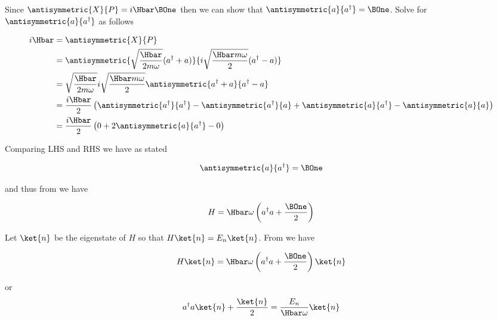 Since \(\antisymmetric{X}{P} = i \Hbar \BOne\) then we can show that \(\antisymmetric{a}{a^\dagger} = \BOne\).  Solve for \(\antisymmetric{a}{a^\dagger}\) as follows

\begin{equation}\label{eqn:lecture11harmonicOscillator:660}
\begin{aligned}
i \Hbar
&=
\antisymmetric{X}{P} \\
&=
\antisymmetric{\sqrt{\frac{\Hbar}{2 m \omega}} (a^\dagger + a) }{i \sqrt{\frac{\Hbar m \omega}{2}} (a^\dagger -a)} \\
&=
\sqrt{\frac{\Hbar}{2 m \omega}} i \sqrt{\frac{\Hbar m \omega}{2}}
\antisymmetric{a^\dagger + a}{a^\dagger -a} \\
&= \frac{i \Hbar}{2}
\left(
\antisymmetric{a^\dagger}{a^\dagger}
-\antisymmetric{a^\dagger}{a}
+\antisymmetric{a}{a^\dagger}
-\antisymmetric{a}{a} \right)  \\
&= \frac{i \Hbar}{2}
\left(
0
+2 \antisymmetric{a}{a^\dagger}
-0
\right)
\end{aligned}
\end{equation}

Comparing LHS and RHS we have as stated

\begin{equation}\label{eqn:PHY356FLecture11:40}
\begin{aligned}
\antisymmetric{a}{a^\dagger} = \BOne
\end{aligned}
\end{equation}

and thus from  we have

\begin{equation}\label{eqn:PHY356FLecture11:50}
H = \Hbar \omega \left( a^\dagger a + \frac{\BOne}{2} \right)
\end{equation}

Let \(\ket{n}\) be the eigenstate of \(H\) so that \(H\ket{n} = E_n \ket{n}\).  From  we have

\begin{equation}\label{eqn:PHY356FLecture11:60}
H \ket{n}
=
\Hbar \omega \left( a^\dagger a + \frac{\BOne}{2} \right) \ket{n}
\end{equation}

or
\begin{equation}\label{eqn:PHY356FLecture11:70}
a^\dagger a \ket{n} + \frac{\ket{n}}{2} = \frac{E_n}{\Hbar \omega} \ket{n}
\end{equation}

